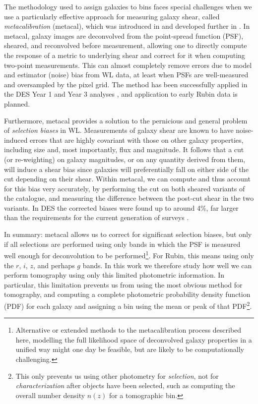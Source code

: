 \documentclass[twocolumn,twocolappendix]{aastex63}
\begin{document}
The methodology used to assign galaxies to bins faces special challenges when we use a particularly
effective approach for measuring galaxy shear, called \emph{metacalibration} (metacal),
which was introduced in \citet{sheldonhuff} and developed further in \citet{sheldon}.
In metacal, galaxy images are deconvolved from the point-spread function (PSF), sheared, and
reconvolved before measurement, allowing one to directly compute the response of a metric
to underlying shear and correct for it when computing two-point measurements.  This can
almost completely remove errors due to model and estimator (noise) bias from WL data, at least
when PSFs are well-measured and oversampled by the pixel grid.  The method has been successfully
applied in the DES Year 1 and Year 3 analyses \citep{des-y1-cat, des-y3-cat},
and application to early Rubin data is planned.

Furthermore, metacal provides a solution to the pernicious and general problem of
\emph{selection biases} in WL.  Measurements of galaxy shear are known to have noise-induced errors
that are
highly covariant with those on other galaxy properties, including size and, most importantly, flux and
magnitude.  It follows that a cut (or re-weighting) on galaxy magnitudes, or on any quantity derived
from  them, will induce a shear bias since galaxies will preferentially fall on either side of the cut
depending on their shear.  Within metacal, we can compute and thus account for this bias
very accurately, by performing the cut on both
sheared variants of the catalogue, and measuring the difference between the post-cut shear in the two
variants.  In DES the corrected biases were found up to around 4\%, far larger than
the requirements for the current generation of surveys \citep{des-y1-cat}.

In summary: metacal allows us to correct for significant selection biases, but only if all selections
are performed using only bands in which the PSF is measured well enough for deconvolution to be
performed\footnote{Alternative or extended methods to the metacalibration process described here, modelling the full likelihood space of deconvolved galaxy properties in a unified way might one day be feasible, but are likely to be computationally challenging.}.  For Rubin, this means using only the $r$, $i$, $z$, and perhaps $g$ bands.  In this work we
therefore study how well we can perform tomography using only this limited photometric information.  In
particular, this limitation prevents us from using the most obvious method for tomography,
and computing a complete photometric probability density function (PDF) for each galaxy and assigning
a bin using the mean or peak of that PDF\footnote{This only prevents us using other photometry for \emph{selection}, not for \emph{characterization} after objects have been selected, such as computing the overall
number density $n(z)$ for a tomographic bin.}.
\end{document}
